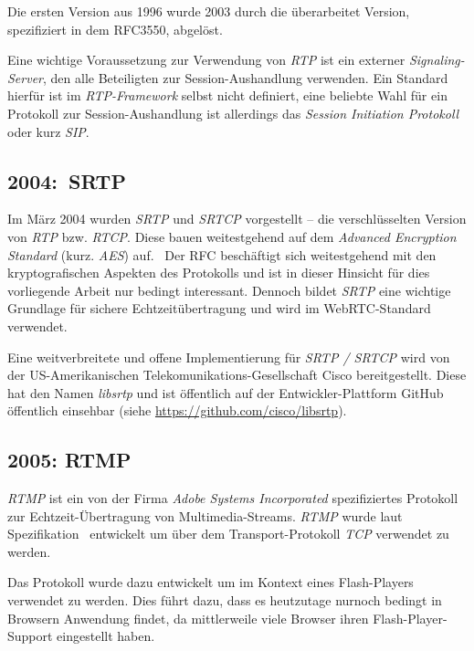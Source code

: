 \documentclass{article}
\begin{document}
\begin{onecolumn}
Die ersten Version aus 1996 wurde 2003 durch die überarbeitet Version,
spezifiziert in dem RFC3550, abgelöst.~\cite{RFC3550}

Eine wichtige Voraussetzung zur Verwendung von \textit{RTP} ist ein externer
\textit{Signaling-Server}, den alle Beteiligten zur Session-Aushandlung
verwenden. Ein Standard hierfür ist im \textit{RTP-Framework} selbst nicht
definiert, eine beliebte Wahl für ein Protokoll zur Session-Aushandlung ist
allerdings das \textit{Session Initiation Protokoll} oder kurz
\textit{SIP}.~\cite{RFC3550, RFC3261}

\subsection{2004:\ SRTP}

Im März 2004 wurden \textit{SRTP} und \textit{SRTCP} vorgestellt – die
verschlüsselten Version von \textit{RTP} bzw. \textit{RTCP}. Diese bauen
weitestgehend auf dem \textit{Advanced Encryption Standard} (kurz.
\textit{AES}) auf.~\cite{RFC3711} Der RFC beschäftigt sich weitestgehend mit
den kryptografischen Aspekten des Protokolls und ist in dieser Hinsicht für
dies vorliegende Arbeit nur bedingt interessant. Dennoch bildet
\textit{SRTP} eine wichtige Grundlage für sichere Echtzeitübertragung und
wird im WebRTC-Standard verwendet.

Eine weitverbreitete und offene Implementierung für \textit{SRTP / SRTCP}
wird von der US-Amerikanischen Telekomunikations-Gesellschaft Cisco
bereitgestellt. Diese hat den Namen \textit{libsrtp} und ist öffentlich auf der
Entwickler-Plattform GitHub öffentlich einsehbar (siehe
\url{https://github.com/cisco/libsrtp}).


\subsection{2005: RTMP}

\textit{RTMP} ist ein von der Firma \textit{Adobe Systems Incorporated}
spezifiziertes Protokoll zur Echtzeit-Übertragung von Multimedia-Streams.
\textit{RTMP} wurde laut Spezifikation~\cite{RTMPSpec} entwickelt um
über dem Transport-Protokoll \textit{TCP} verwendet zu werden.

Das Protokoll wurde dazu entwickelt um im Kontext eines Flash-Players verwendet
zu werden. Dies führt dazu, dass es heutzutage nurnoch bedingt in Browsern
Anwendung findet, da mittlerweile viele Browser ihren Flash-Player-Support
eingestellt haben.~\cite{RTMPFlashSupport}


\end{onecolumn}
\end{document}
